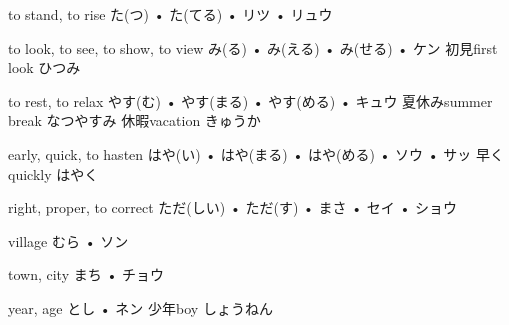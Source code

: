 



\setcounter{cardnum}{65}

		{to stand, to rise}
		{た(つ) • た(てる) • リツ • リュウ}
		{}{}
		{}{}
		{}{}
		{}{}
		{}{}

		{to look, to see, to show, to view}
		{み(る) • み(える) • み(せる) • ケン}
		{初見}{first look ひつみ}
		{}{}
		{}{}
		{}{}
		{}{}

		{to rest, to relax}
		{やす(む) • やす(まる) • やす(める) • キュウ}
		{夏休み}{summer break なつやすみ}
		{休暇}{vacation きゅうか}
		{}{}
		{}{}
		{}{}

		{early, quick, to hasten}
		{はや(い) • はや(まる) • はや(める) • ソウ • サッ}
		{早く}{quickly はやく}
		{}{}
		{}{}
		{}{}
		{}{}

		{right, proper, to correct}
		{ただ(しい) • ただ(す) • まさ • セイ • ショウ}
		{}{}
		{}{}
		{}{}
		{}{}
		{}{}

		{village}
		{むら • ソン}
		{}{}
		{}{}
		{}{}
		{}{}
		{}{}

		{town, city}
		{まち • チョウ}
		{}{}
		{}{}
		{}{}
		{}{}
		{}{}

		{year, age}
		{とし • ネン}
		{少年}{boy しょうねん}
		{}{}
		{}{}
		{}{}
		{}{}


